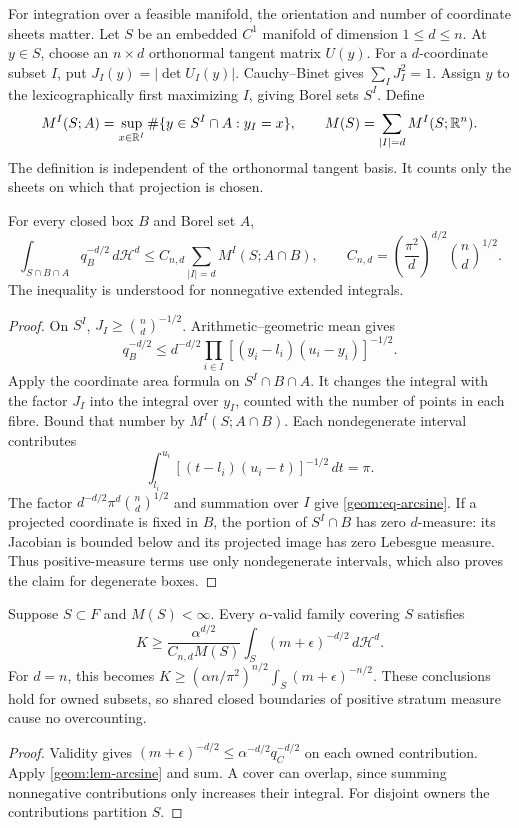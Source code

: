 For integration over a feasible manifold, the orientation and number of
coordinate sheets matter. Let $S$ be an embedded $C^1$ manifold of
dimension $1\leq d\leq n$. At $y\in S$, choose an $n\times d$ orthonormal
tangent matrix $U(y)$. For a $d$-coordinate subset $I$, put
$J_I(y)=|\det U_I(y)|$. Cauchy--Binet gives $\sum_I J_I^2=1$.
Assign $y$ to the lexicographically first maximizing $I$, giving Borel
sets $S^I$. Define
\[
 M^I(S;A)=\sup_{x\in\mathbb{R}^I}
       \#\{y\in S^I\cap A:y_I=x\},\qquad
 M(S)=\sum_{|I|=d}M^I(S;\mathbb{R}^n).
\]
The definition is independent of the orthonormal tangent basis. It counts
only the sheets on which that projection is chosen.

\begin{lemma}\label{geom:lem-arcsine}
For every closed box $B$ and Borel set $A$,
\begin{equation}\label{geom:eq-arcsine}
 \int_{S\cap B\cap A}q_B^{-d/2}\,d\mathcal H^d
 \leq C_{n,d}\sum_{|I|=d}M^I(S;A\cap B),\qquad
 C_{n,d}=\left(\frac{\pi^2}{d}\right)^{d/2}
                                  \binom nd^{1/2}.
\end{equation}
The inequality is understood for nonnegative extended integrals.
\end{lemma}
\begin{proof}
On $S^I$, $J_I\geq\binom nd^{-1/2}$. Arithmetic--geometric mean gives
\[
 q_B^{-d/2}\leq d^{-d/2}\prod_{i\in I}
                  [(y_i-l_i)(u_i-y_i)]^{-1/2}.
\]
Apply the coordinate area formula on $S^I\cap B\cap A$. It changes the
integral with the factor $J_I$ into the integral over $y_I$, counted with
the number of points in each fibre. Bound that number by
$M^I(S;A\cap B)$. Each nondegenerate interval contributes
\[
 \int_{l_i}^{u_i}[(t-l_i)(u_i-t)]^{-1/2}\,dt=\pi.
\]
The factor $d^{-d/2}\pi^d\binom nd^{1/2}$ and summation over $I$ give
\cref{geom:eq-arcsine}. If a projected coordinate is fixed in $B$, the
portion of $S^I\cap B$ has zero $d$-measure: its Jacobian is bounded below
and its projected image has zero Lebesgue measure. Thus positive-measure
terms use only nondegenerate intervals, which also proves the claim for
degenerate boxes.
\end{proof}

\begin{theorem}\label{geom:thm-stratum}
Suppose $S\subset F$ and $M(S)<\infty$. Every $\alpha$-valid family
covering $S$ satisfies
\begin{equation}\label{geom:eq-stratum-lower}
 K\geq\frac{\alpha^{d/2}}{C_{n,d}M(S)}
              \int_S(m+\epsilon)^{-d/2}\,d\mathcal H^d.
\end{equation}
For $d=n$, this becomes
$K\geq(\alpha n/\pi^2)^{n/2}\int_S(m+\epsilon)^{-n/2}$.
These conclusions hold for owned subsets, so shared closed boundaries
of positive stratum measure cause no overcounting.
\end{theorem}
\begin{proof}
Validity gives $(m+\epsilon)^{-d/2}\leq
\alpha^{-d/2}q_C^{-d/2}$ on each owned contribution. Apply
\cref{geom:lem-arcsine} and sum. A cover can overlap, since summing
nonnegative contributions only increases their integral. For disjoint
owners the contributions partition $S$.
\end{proof}

